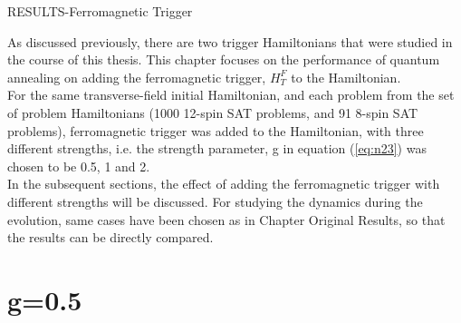 \documentclass[12]{article}
\begin{document}
\begin{center}
\begin{Huge}
RESULTS-Ferromagnetic Trigger
\end{Huge}
\end{center}
As discussed previously, there are two trigger Hamiltonians that were studied in the course of this thesis. This chapter focuses on the performance of quantum annealing on adding the ferromagnetic trigger, $H_T^F$ to the Hamiltonian. \\
For the same transverse-field initial Hamiltonian, and each problem from the set of problem Hamiltonians (1000 12-spin SAT problems, and 91 8-spin SAT problems), ferromagnetic trigger was added to the Hamiltonian, with three different strengths, i.e. the strength parameter, g in equation (\ref{eq:n23}) was chosen to be 0.5, 1 and 2.\\
In the subsequent sections, the effect of adding the ferromagnetic trigger with different strengths will be discussed. For studying the dynamics during the evolution, same cases have been chosen as in Chapter Original Results, so that the results can be directly compared. 

\section*{g=0.5} 
\end{document}
